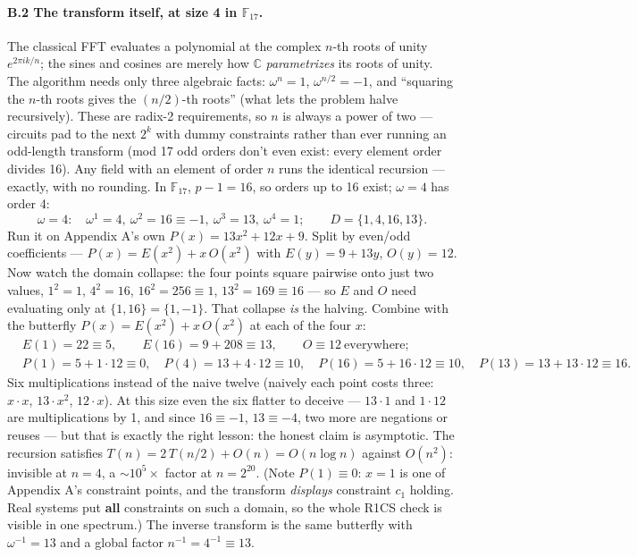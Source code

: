 \documentclass[10pt]{article}
\begin{document}
\paragraph{B.2 The transform itself, at size 4 in
$\mathbb{F}_{17}$.} The classical FFT evaluates a polynomial at the
complex $n$-th roots of unity $e^{2\pi i k/n}$; the sines and
cosines are merely how $\mathbb{C}$ \emph{parametrizes} its roots
of unity. The algorithm needs only three algebraic facts:
$\omega^n = 1$, $\omega^{n/2} = -1$, and ``squaring the $n$-th
roots gives the $(n/2)$-th roots'' (what lets the problem halve
recursively). These are radix-2 requirements, so $n$ is always a
power of two --- circuits pad to the next $2^k$ with dummy
constraints rather than ever running an odd-length transform (mod
17 odd orders don't even exist: every element order divides 16).
Any field with an element of order $n$ runs the
identical recursion --- exactly, with no rounding. In
$\mathbb{F}_{17}$, $p-1 = 16$, so orders up to 16 exist;
$\omega = 4$ has order 4:
\[
\omega = 4:\quad \omega^1 = 4,\ \omega^2 = 16 \equiv -1,\
\omega^3 = 13,\ \omega^4 = 1;\qquad
D = \{1, 4, 16, 13\}.
\]
Run it on Appendix A's own $P(x) = 13x^2 + 12x + 9$. Split by
even/odd coefficients --- $P(x) = E(x^2) + x\,O(x^2)$ with
$E(y) = 9 + 13y$, $O(y) = 12$. Now watch the domain collapse: the
four points square pairwise onto just two values, $1^2 = 1$,
$4^2 = 16$, $16^2 = 256 \equiv 1$, $13^2 = 169 \equiv 16$ --- so
$E$ and $O$ need evaluating only at $\{1, 16\} = \{1, -1\}$.
That collapse \emph{is} the halving. Combine with the butterfly
$P(x) = E(x^2) + x\,O(x^2)$ at each of the four $x$:
\[
\begin{aligned}
&E(1) = 22 \equiv 5, \qquad E(16) = 9 + 208 \equiv 13, \qquad
 O \equiv 12\ \text{everywhere};\\
&P(1) = 5 + 1\cdot12 \equiv 0, \quad
 P(4) = 13 + 4\cdot12 \equiv 10, \quad
 P(16) = 5 + 16\cdot12 \equiv 10, \quad
 P(13) = 13 + 13\cdot12 \equiv 16.
\end{aligned}
\]
Six multiplications instead of the naive twelve (naively each
point costs three: $x\cdot x$, $13\cdot x^2$, $12\cdot x$). At
this size even the six flatter to deceive --- $13\cdot1$ and
$1\cdot12$ are multiplications by 1, and since $16 \equiv -1$,
$13 \equiv -4$, two more are negations or reuses --- but that is
exactly the right lesson: the honest claim is asymptotic. The
recursion satisfies $T(n) = 2\,T(n/2) + O(n) = O(n\log n)$
against $O(n^2)$: invisible at $n = 4$, a ${\sim}10^{5}\times$
factor at $n = 2^{20}$. (Note $P(1) \equiv 0$: $x{=}1$ is one of Appendix
A's constraint points, and the transform \emph{displays} constraint
$c_1$ holding. Real systems put \textbf{all} constraints on such a
domain, so the whole R1CS check is visible in one spectrum.) The
inverse transform is the same butterfly with $\omega^{-1} = 13$ and
a global factor $n^{-1} = 4^{-1} \equiv 13$.
\end{document}

